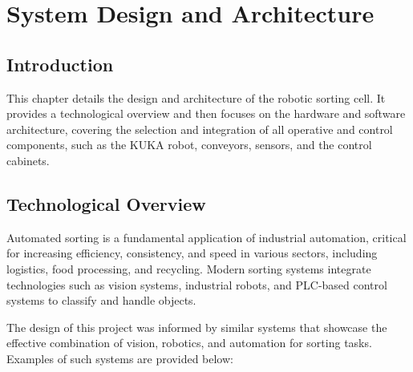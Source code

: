 \chapter{System Design and Architecture}

\section{Introduction}
This chapter details the design and architecture of the robotic sorting cell. It provides a technological overview and then focuses on the hardware and software architecture, covering the selection and integration of all operative and control components, such as the KUKA robot, conveyors, sensors, and the control cabinets.

\section{Technological Overview}
Automated sorting is a fundamental application of industrial automation, critical for increasing efficiency, consistency, and speed in various sectors, including logistics, food processing, and recycling. Modern sorting systems integrate technologies such as vision systems, industrial robots, and PLC-based control systems to classify and handle objects.

The design of this project was informed by similar systems that showcase the effective combination of vision, robotics, and automation for sorting tasks. Examples of such systems are provided below:

